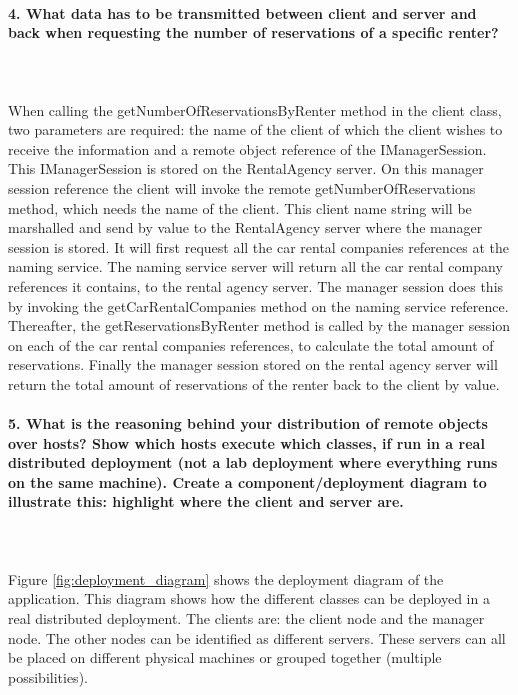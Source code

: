\documentclass{ds-report}
\begin{document}
	\paragraph{4. What data has to be transmitted between client and server and back when requesting the number of reservations of a specific renter?} \mbox{}\\\\
When calling the getNumberOfReservationsByRenter method in the client class, two parameters are required: the name of the client of which the client wishes to receive the information and a remote object reference of the IManagerSession. This IManagerSession is stored on the RentalAgency server. On this manager session reference the client will invoke the remote getNumberOfReservations method, which needs the name of the client. This client name string will be marshalled and send by value to the RentalAgency server where the manager session is stored. It will first request all the car rental companies references at the naming service. The naming service server will return all the car rental company references it contains, to the rental agency server. The manager session does this by invoking the getCarRentalCompanies method on the naming service reference.
Thereafter, the getReservationsByRenter method is called by the manager session on each of the car rental companies references, to calculate the total amount of reservations. Finally the manager session stored on the rental agency server will return the total amount of reservations of the renter back to the client by value.   

\clearpage
	\paragraph{5. What is the reasoning behind your distribution of remote objects over hosts? Show which hosts execute which classes, if run in a real distributed deployment (not a lab deployment where everything runs on the same machine). Create a component/deployment diagram to illustrate this: highlight where the client and server are.} \mbox{}\\\\
Figure \ref{fig:deployment_diagram} shows the deployment diagram of the application. This diagram shows how the different classes can be deployed in a real distributed deployment. The clients are: the client node and the manager node. The other nodes can be identified as different servers. These servers can all be placed on different physical machines or grouped together (multiple possibilities).
\end{document}
